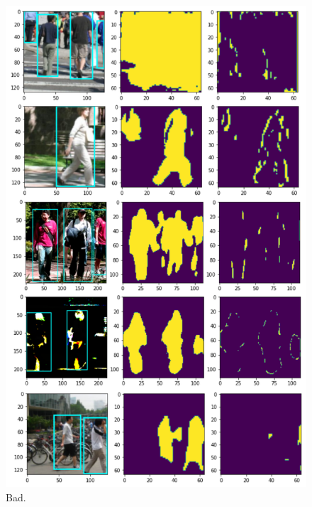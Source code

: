 \documentclass[a4paper]{article}
\begin{document}
\begin{figure}[h]
\begin{minipage}[b]{0.45\textwidth}
        \includegraphics[width=\textwidth]{imgs/worst.png}
        \caption{Bad.}
    \end{minipage}
\end{figure}
\end{document}

